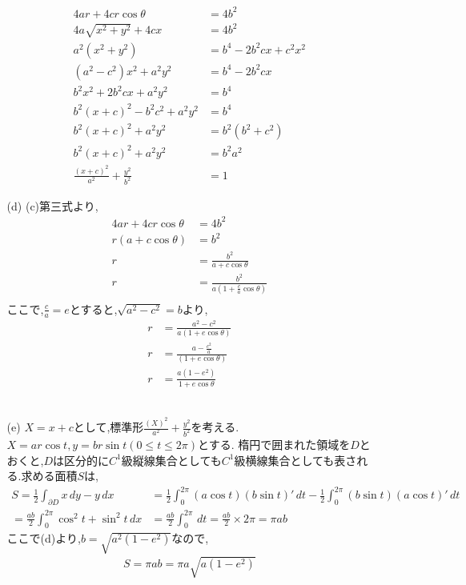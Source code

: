 \documentclass{jsarticle}
\begin{document}
\begin{itemize}
\begin{itemize}
\begin{align*}
      4ar + 4cr\cos\theta &= 4b^2\\
      4a\sqrt{x^2+y^2} + 4cx &= 4b^2\\
      a^2(x^2+y^2) &= b^4 -2b^2cx +c^2x^2\\
      (a^2-c^2)x^2 + a^2y^2 &= b^4 -2b^2cx\\
      b^2x^2 + 2b^2cx + a^2y^2 &= b^4\\
      b^2(x+c)^2 - b^2c^2 +a^2y^2 &= b^4\\
      b^2(x+c)^2 +a^2y^2 &= b^2(b^2+c^2)\\
      b^2(x+c)^2 +a^2y^2 &= b^2a^2\\
      \frac{(x+c)^2}{a^2} + \frac{y^2}{b^2} &=1 
    \end{align*}  
    \item[(d)] (c)第三式より,
    \begin{align*}
      4ar + 4cr\cos\theta &= 4b^2\\
      r(a + c\cos\theta) &= b^2\\
      r &= \frac{b^2}{a + c\cos\theta}\\
      r &= \frac{b^2}{a(1 + \frac{c}{a}\cos\theta)}\\
    \end{align*}
    ここで,$\frac{c}{a}=e$とすると,$\sqrt{a^2-c^2}=b$より,
    \begin{align*}
      r &= \frac{a^2-c^2}{a(1 + e\cos\theta)}\\
      r &= \frac{a-\frac{c^2}{a}}{(1 + e\cos\theta)}\\
      r &= \frac{a(1-e^2)}{1+e\cos\theta}
    \end{align*} 
    \leavevmode\\ 
    \item[(e)] $X=x+c$として,標準形$\frac{(X)^2}{a^2} + \frac{y^2}{b^2}$を考える.
    $X = ar\cos t,y = br\sin t(0\leq t\leq 2\pi)$とする.
    楕円で囲まれた領域を$D$とおくと,$D$は区分的に$C^1$級縦線集合としても$C^1$級横線集合としても表される.求める面積$S$は,
    \begin{align*}
      S = \frac{1}{2}\int_{\partial D} x\,dy - y\,dx &= \frac{1}{2}\int_{0}^{2\pi}(a\cos t)(b\sin t)'\,dt - \frac{1}{2}\int_{0}^{2\pi}(b\sin t)(a\cos t)'\,dt\\
      =\frac{ab}{2}\int_{0}^{2\pi}\cos^2 t + \sin^2 t\,dx &= \frac{ab}{2}\int_{0}^{2\pi}\,dt =\frac{ab}{2}\times 2\pi = \pi ab 
    \end{align*}
    ここで(d)より,$b = \sqrt{a^2(1-e^2)}$なので,
    \begin{align*}
      S = \pi ab = \pi a\sqrt{a(1-e^2)}

\end{align*}
\end{itemize}
\end{itemize}
\end{document}
